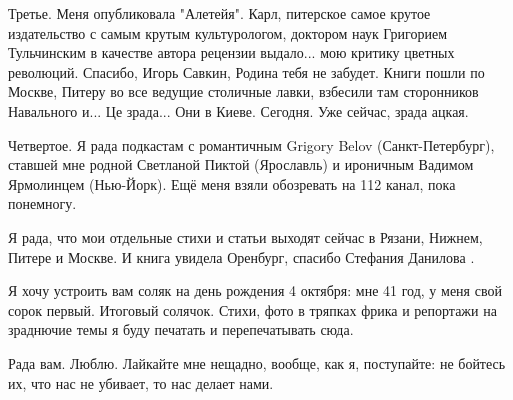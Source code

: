Третье. Меня опубликовала "Алетейя". Карл, питерское самое крутое издательство
с самым крутым культурологом, доктором наук Григорием Тульчинским в качестве
автора рецензии выдало... мою критику цветных революций. Спасибо, Игорь Савкин,
Родина тебя не забудет. Книги пошли по Москве, Питеру во все ведущие столичные
лавки, взбесили там сторонников Навального и... Це зрада... Они в Киеве.
Сегодня. Уже сейчас, зрада ацкая.

Четвертое. Я рада подкастам с романтичным Grigory Belov (Санкт-Петербург),
ставшей мне родной Светланой Пиктой (Ярославль) и ироничным Вадимом Ярмолинцем
(Нью-Йорк). Ещё меня взяли обозревать на 112 канал, пока понемногу. 

Я рада, что мои отдельные стихи и статьи выходят сейчас в Рязани, Нижнем,
Питере и Москве. И книга увидела Оренбург, спасибо Стефания Данилова .

Я хочу устроить вам соляк на день рождения 4 октября: мне 41 год, у меня свой
сорок первый. Итоговый солячок. Стихи, фото в тряпках  фрика и репортажи на
зраднючие темы  я буду печатать и перепечатывать сюда. 

Рада вам. Люблю. Лайкайте мне нещадно, вообще, как я, поступайте: не бойтесь
их, что нас не убивает, то нас делает нами.
